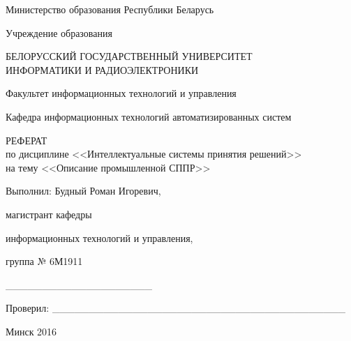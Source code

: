 \begin{titlepage}
\thispagestyle{empty}
\setlength{\parindent}{0cm} %

{\centering{}
  Министерство образования Республики Беларусь

  \smallskip
  Учреждение образования

  БЕЛОРУССКИЙ ГОСУДАРСТВЕННЫЙ УНИВЕРСИТЕТ \\
  ИНФОРМАТИКИ И РАДИОЭЛЕКТРОНИКИ

  \smallskip
  Факультет информационных технологий и управления

  \smallskip
  Кафедра информационных технологий автоматизированных систем\par
}

\vspace{50mm}

{\centering{}
  РЕФЕРАТ \\
  по дисциплине <<Интеллектуальные системы принятия решений>> \\
  на тему <<Описание промышленной СППР>>\par
}

\vspace{30mm}

\begin{minipage}{.1\linewidth}
\end{minipage}
\hfill
\begin{minipage}{.8\linewidth}
  Выполнил: Будный Роман Игоревич,

  \hspace{2.4cm} магистрант кафедры

  \hspace{2.4cm} информационных технологий и управления,

  \hspace{2.4cm} группа № 6М1911

  \hspace{2.4cm} \_\_\_\_\_\_\_\_\_\_\_\_\_\_\_\_\_\_\_\_

  \smallskip
  Проверил: \;\_\_\_\_\_\_\_\_\_\_\_\_\_\_\_\_\_\_\_\_\_\_\_\_\_\_\_\_\_\_\_\_\_\_\_\_\_\_\_\_
\end{minipage}

\vfill
{\centering{}
  Минск 2016\par
}

\setlength{\parindent}{1.25cm} %
\end{titlepage}
